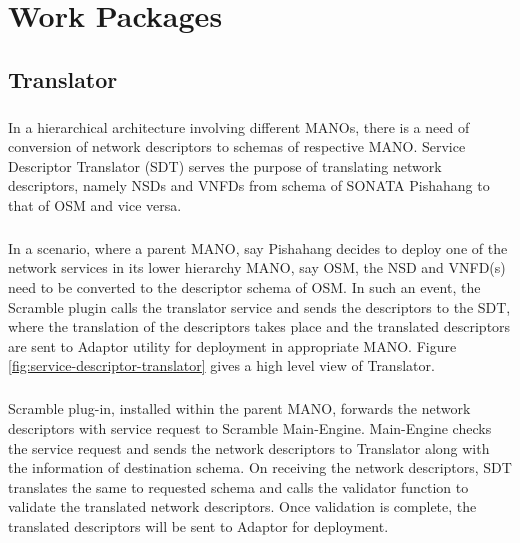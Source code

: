 \chapter{Work Packages}
\label{ch:WP}

\section{Translator}
\paragraph{}
In a hierarchical architecture involving different MANOs, there is a need of conversion of network descriptors to schemas of respective MANO. Service Descriptor Translator (SDT) serves the purpose of translating network descriptors, namely NSDs and VNFDs from schema of SONATA Pishahang to that of OSM and vice versa.
\paragraph{}
In a scenario, where a parent MANO, say Pishahang decides to deploy one of the network services in its lower hierarchy MANO, say OSM, the NSD and VNFD(s) need to be converted to the descriptor schema of OSM. In such an event, the Scramble plugin calls the translator service and sends the descriptors to the SDT, where the translation of the descriptors takes place and the translated descriptors are sent to Adaptor utility for deployment in appropriate MANO. Figure \ref{fig:service-descriptor-translator} gives a high level view of Translator.
\paragraph{}
Scramble plug-in, installed within the parent MANO, forwards the network descriptors with service request to Scramble Main-Engine. Main-Engine checks the service request and sends the network descriptors to Translator along with the information of destination schema. On receiving the network descriptors, SDT translates the same to requested schema and calls the validator function to validate the translated network descriptors. Once validation is complete, the translated descriptors will be sent to Adaptor for deployment. 


